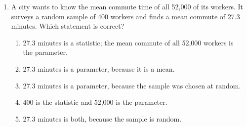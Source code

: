 \documentclass[12pt]{article}
\begin{document}
\begin{enumerate}[leftmargin=1.9em, itemsep=0.13in]
        \vspace{3pt}
        {\centering
        \par}
        \vspace{1pt}

        Which statement is true?\hfill{}\rule[-0.2in]{0pt}{0.48in}
        \begin{enumerate}[label=\textbf{(\Alph*)}, leftmargin=2.2em, itemsep=2pt]
          \item More days had 34 to 60 customers than 18 to 22, because that whisker is longer.
          \item On about half of the days, the truck served fewer than 18 customers.
          \item About 20 days had 18 to 22 customers, and about 20 days had 34 to 60.
          \item The mean number of customers per day was 22.
          \item The truck never served more than 34 customers in a day.
        \end{enumerate}

  \boxguard[11]
  \item A city wants to know the mean commute time of all 52{,}000 of its workers. It surveys
        a random sample of 400 workers and finds a mean commute of 27.3 minutes. Which
        statement is correct?
        \begin{enumerate}[label=\textbf{(\Alph*)}, leftmargin=2.2em, itemsep=2pt]
          \item 27.3 minutes is a statistic; the mean commute of all 52{,}000 workers is\\
                the parameter.
          \item 27.3 minutes is a parameter, because it is a mean.
          \item 27.3 minutes is a parameter, because the sample was chosen at random.
          \item 400 is the statistic and 52{,}000 is the parameter.
          \item 27.3 minutes is both, because the sample is random.\hfill{}\rule[-0.2in]{0pt}{0.48in}
        \end{enumerate}


\end{enumerate}
\end{document}

